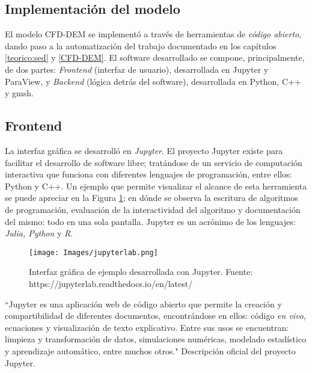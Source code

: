 \begin{center}
	\section{Implementaci\'on del modelo}
\end{center}

\noindent
\justify

El modelo CFD-DEM se implement\'o a trav\'es de herramientas de \textit{c\'odigo abierto}, dando paso a la automatizaci\'on del trabajo documentado en los cap\'itulos \ref{teorico:sed} y \ref{CFD-DEM}. El software desarrollado se compone, principalmente, de dos partes: \textit{Frontend} (interfaz de usuario), desarrollada en Jupyter y ParaView, y \textit{Backend} (l\'ogica detr\'as del software), desarrollada en Python, C++ y gmsh. 

\subsection{Frontend}

\noindent
\justify

La interfaz gr\'afica se desarroll\'o en \textit{Jupyter}. El proyecto Jupyter existe para facilitar el desarrollo de software libre; trat\'andose de un servicio de computaci\'on interactiva que funciona con diferentes lenguajes de programaci\'on, entre ellos: Python y C++. Un ejemplo que permite visualizar el alcance de esta herramienta se puede apreciar en la Figura \ref{jupyter}; en d\'onde se observa la escritura de algoritmos de programaci\'on, evaluaci\'on de la interactividad del algoritmo y documentaci\'on del mismo: todo en una sola pantalla. Jupyter es un acr\'onimo de los lenguajes: \textit{Julia, Python} y \textit{R}.

\begin{figure}[h!]
	\centering
	\texttt{[image: Images/jupyterlab.png]}
	\caption{Interfaz gr\'afica de ejemplo desarrollada con Jupyter. Fuente: https://jupyterlab.readthedocs.io/en/latest/}
	\label{jupyter}
\end{figure}

\noindent
\justify

``Jupyter es una aplicaci\'on web de c\'odigo abierto que permite la creaci\'on y compartibilidad de diferentes documentos, encontr\'andose en ellos: c\'odigo \textit{en vivo}, ecuaciones y visualizaci\'on de texto explicativo. Entre sus usos se encuentran: limpieza y transformaci\'on de datos, simulaciones num\'ericas, modelado estad\'istico y aprendizaje autom\'atico, entre muchos otros." Descripci\'on oficial del proyecto Jupyter.

